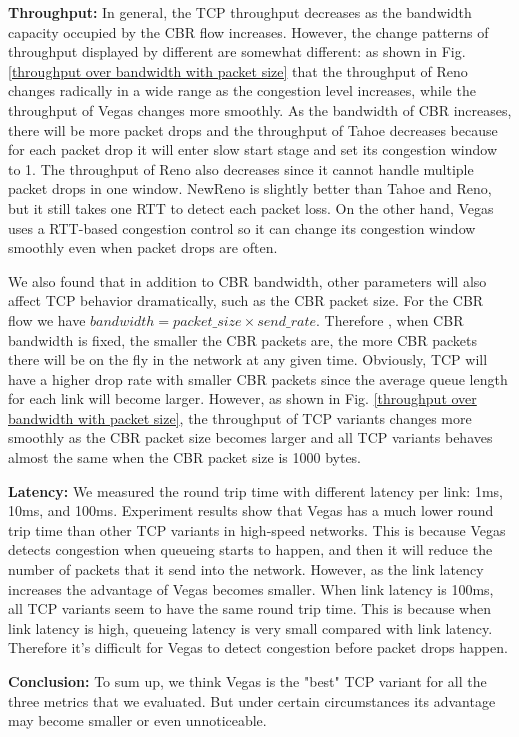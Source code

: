 \documentclass[USenglish,oneside,twocolumn]{article}
\begin{document}
\noindent \textbf{Throughput:} In general, the TCP throughput decreases as the bandwidth capacity occupied by the CBR flow increases. However, the change patterns of throughput displayed by different are somewhat different: as shown in Fig. \ref{throughput over bandwidth with packet size} that the throughput of Reno changes radically in a wide range as the congestion level increases, while the throughput of Vegas changes more smoothly. As the bandwidth of CBR increases, there will be more packet drops and the throughput of Tahoe decreases because for each packet drop it will enter slow start stage and set its congestion window to 1. The throughput of Reno also decreases since it cannot handle multiple packet drops in one window. NewReno is slightly better than Tahoe and Reno, but it still takes one RTT to detect each packet loss. On the other hand, Vegas uses a RTT-based congestion control so it can change its congestion window smoothly even when packet drops are often.

We also found that in addition to CBR bandwidth, other parameters will also affect TCP behavior dramatically, such as the CBR packet size. For the CBR flow we have \(bandwidth = packet\_size \times send\_rate\). Therefore , when CBR bandwidth is fixed, the smaller the CBR packets are, the more CBR packets there will be on the fly in the network at any given time. Obviously, TCP will have a higher drop rate with smaller CBR packets since the average queue length for each link will become larger. However, as shown in Fig. \ref{throughput over bandwidth with packet size}, the throughput of TCP variants changes more smoothly as the CBR packet size becomes larger and all TCP variants behaves almost the same when the CBR packet size is 1000 bytes. 

\noindent \textbf{Latency:} We measured the round trip time with different latency per link: 1ms, 10ms, and 100ms. Experiment results show that Vegas has a much lower round trip time than other TCP variants in high-speed networks. This is because Vegas detects congestion when queueing starts to happen, and then it will reduce the number of packets that it send into the network. However, as the link latency increases the advantage of Vegas becomes smaller. When link latency is 100ms, all TCP variants seem to have the same round trip time. This is because when link latency is high, queueing latency is very small compared with link latency. Therefore it's difficult for Vegas to detect congestion before packet drops happen.

\noindent \textbf{Conclusion:} To sum up, we think Vegas is the "best" TCP variant for all the three metrics that we evaluated. But under certain circumstances its advantage may become smaller or even unnoticeable.
\end{document}
